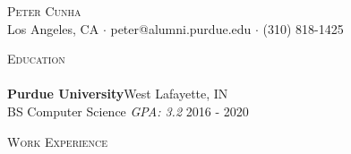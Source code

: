 \documentclass[a4paper]{article}
\newcommand{\lineunder} {
    \vspace*{-8pt} \\
    \hspace*{-18pt} \hrulefill \\
}
\newcommand{\header} [1] {
    {\hspace*{-18pt}\vspace*{6pt} \textsc{#1}}
    \vspace*{-6pt} \lineunder
}
\begin{document}
\vspace*{-40pt}

    

\vspace*{-10pt}
\begin{center}
	{\Huge \scshape {Peter Cunha}}\\
	Los Angeles, CA $\cdot$ peter@alumni.purdue.edu $\cdot$ (310) 818-1425\\
\end{center}

\header{Education}
\textbf{Purdue University}\hfill West Lafayette, IN\\
BS Computer Science \textit{GPA: 3.2} \hfill 2016 - 2020\\
\vspace{2mm}

\header{Work Experience}
\vspace{1mm}
\end{document}
